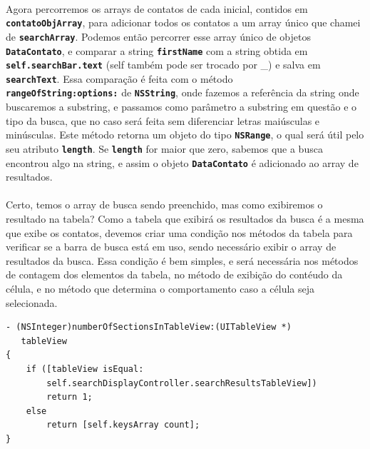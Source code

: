 \documentclass[a4paper,12pt,brazil,doubleside]{book}
\begin{document}
\paragraph{}Agora percorremos os arrays de contatos de cada inicial, contidos em \texttt{\textbf{contatoObjArray}}, para adicionar todos os contatos a um array único que chamei de \texttt{\textbf{searchArray}}. Podemos então percorrer esse array único de objetos \texttt{\textbf{DataContato}}, e comparar a string \texttt{\textbf{firstName}} com a string obtida em \texttt{\textbf{self.searchBar.text}} (self também pode ser trocado por \_) e salva em \texttt{\textbf{searchText}}. Essa comparação é feita com o método\\
\texttt{\textbf{rangeOfString:options:}} de \texttt{\textbf{NSString}}, onde fazemos a referência da string onde buscaremos a substring, e passamos como parâmetro a substring em questão e o tipo da busca, que no caso será feita sem diferenciar letras maiúsculas e minúsculas. Este método retorna um objeto do tipo \texttt{\textbf{NSRange}}, o qual será útil pelo seu atributo \texttt{\textbf{length}}. Se \texttt{\textbf{length}} for maior que zero, sabemos que a busca encontrou algo na string, e assim o objeto \texttt{\textbf{DataContato}} é adicionado ao array de resultados.
\paragraph{}Certo, temos o array de busca sendo preenchido, mas como exibiremos o resultado na tabela? Como a tabela que exibirá os resultados da busca é a mesma que exibe os contatos, devemos criar uma condição nos métodos da tabela para verificar se a barra de busca está em uso, sendo necessário exibir o array de resultados da busca. Essa condição é bem simples, e será necessária nos métodos de contagem dos elementos da tabela, no método de exibição do contéudo da célula, e no método que determina o comportamento caso a célula seja selecionada.

\begin{listing}
\begin{verbatim}
- (NSInteger)numberOfSectionsInTableView:(UITableView *)
   tableView
{
    if ([tableView isEqual:
        self.searchDisplayController.searchResultsTableView])
        return 1;
    else
        return [self.keysArray count];
}
\end{verbatim}
\end{listing}
\end{document}
